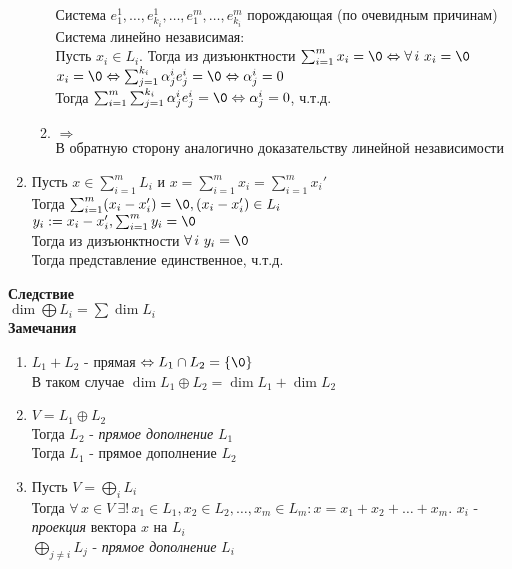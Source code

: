 \documentclass[12pt]{article}
\begin{document}
\begin{enumerate}
\begin{enumerate}
        Система $e_1^1, \ldots, e_{k_i}^1, \ldots, e_1^m, \ldots, e_{k_i}^m$ порождающая (по очевидным причинам)\\
        Система линейно независимая:\\
        Пусть $x_i \in L_i$. Тогда из дизъюнктности $\sum_{i=1}^m x_i = \0 \Leftrightarrow \forall\,i\ x_i = \0$\\
        $x_i = \0 \Leftrightarrow \sum_{j=1}^{k_i} \alpha_j^i e_j^i = \0 \Leftrightarrow \alpha_j^i = 0$\\
        Тогда $\sum_{i=1}^m \sum_{j=1}^{k_i} \alpha_j^i e_j^i = \0 \Leftrightarrow \alpha_j^i = 0$, ч.т.д.
        \item $\Rightarrow$\\
        В обратную сторону аналогично доказательству линейной независимости
    \end{enumerate}
    
    \item Пусть $x \in \sum_{i=1}^m L_i$ и $x = \sum_{i=1}^m x_i = \sum_{i=1}^m x_i'$\\
    Тогда $\sum_{i=1}^m (x_i-x_i') = \0, (x_i-x_i') \in L_i$\\
    $y_i := x_i - x_i', \sum_{i=1}^m y_i = \0$\\
    Тогда из дизъюнктности $\forall\,i\ y_i = \0$\\
    Тогда представление единственное, ч.т.д.
\end{enumerate}
\textbf{Следствие}\\
$\dim \bigoplus L_i = \sum \dim L_i$\\
\textbf{Замечания}
\begin{enumerate}
    \item $L_1 + L_2$ - прямая $\Leftrightarrow L_1 \cap L_2 = \{\0\}$\\
    В таком случае $\dim L_1 \oplus L_2 = \dim L_1 + \dim L_2$
    \item $V = L_1 \oplus L_2$\\
    Тогда $L_2$ - \textit{прямое дополнение} $L_1$\\
    Тогда $L_1$ - прямое дополнение $L_2$
    \item Пусть $V = \bigoplus_i L_i$\\
    Тогда $\forall\,x\in V\ \exists!\,x_1 \in L_1, x_2\in L_2, \ldots, x_m \in L_m: x = x_1 + x_2 + \ldots + x_m$. $x_i$ - \textit{проекция} вектора $x$ на $L_i$\\
    $\bigoplus_{j\neq i} L_j$ - \textit{прямое дополнение} $L_i$
\end{enumerate}
\end{document}
